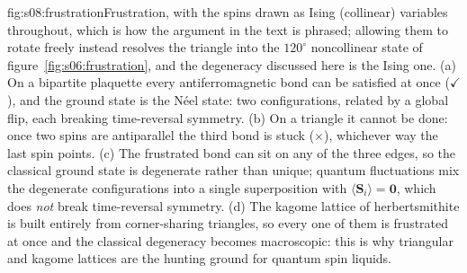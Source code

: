 %
\begin{aqmfigure}{fig:s08:frustration}{Frustration, with the spins drawn as Ising (collinear)
variables throughout, which is how the argument in the text is phrased; allowing them to rotate
freely instead resolves the triangle into the $120^\circ$ noncollinear state of
figure~\ref{fig:s06:frustration}, and the degeneracy discussed here is the Ising one.
(a) On a bipartite plaquette every
antiferromagnetic bond can be satisfied at once ($\checkmark$), and the ground state is the
N\'eel state: two configurations, related by a global flip, each breaking time-reversal symmetry.
(b) On a triangle it cannot be done: once two spins are antiparallel the third bond is stuck
($\times$), whichever way the last spin points. (c) The frustrated bond can sit on any of the three
edges, so the classical ground state is degenerate rather than unique; quantum fluctuations mix the
degenerate configurations into a single superposition with $\langle\mathbf S_i\rangle=\mathbf 0$,
which does \emph{not} break time-reversal symmetry. (d) The kagome lattice of herbertsmithite is
built entirely from corner-sharing triangles, so every one of them is frustrated at once and the
classical degeneracy becomes macroscopic: this is why triangular and kagome lattices are the
hunting ground for quantum spin liquids.}

\end{aqmfigure}
